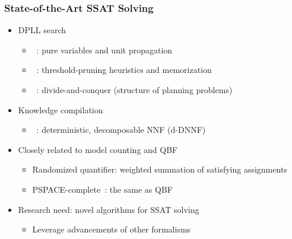 \begin{frame}
      \frametitle{State-of-the-Art SSAT Solving}
      \begin{itemize}
            \item DPLL search~\cite{Davis1962}
                  \begin{itemize}
                        \item \maxplan~\cite{Majercik1998}: pure variables and unit propagation
                        \item \zander~\cite{Majercik2003}: threshold-pruning heuristics and memorization
                        \item \dcssat~\cite{Majercik2005}: divide-and-conquer (structure of planning problems)
                  \end{itemize}
                  \pause
            \item Knowledge compilation~\cite{Darwiche2002KnowledgeCompilation}
                  \begin{itemize}
                        \item \complan~\cite{Huang2006}: deterministic, decomposable NNF (d-DNNF)~\cite{Darwiche2001,Darwiche2002dDNNF}
                  \end{itemize}
                  \pause
            \item Closely related to model counting and QBF
                  \begin{itemize}
                        \item Randomized quantifier: weighted summation of satisfying assignments
                        \item PSPACE-complete~\cite{Stockmeyer1973}: the same as QBF
                  \end{itemize}
                  \pause
            \item \alert{Research need: novel algorithms for SSAT solving}
                  \begin{itemize}
                        \item Leverage advancements of other formalisms
                  \end{itemize}
      \end{itemize}
\end{frame}

